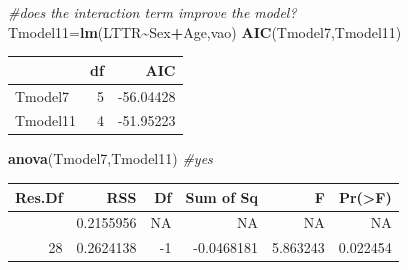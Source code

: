 \documentclass[
]{article}
\newenvironment{Shaded}{\begin{snugshade}}{\end{snugshade}}
\newcommand{\CommentTok}[1]{\textcolor[rgb]{0.56,0.35,0.01}{\textit{#1}}}
\newcommand{\FunctionTok}[1]{\textcolor[rgb]{0.13,0.29,0.53}{\textbf{#1}}}
\newcommand{\NormalTok}[1]{#1}
\newcommand{\OtherTok}[1]{\textcolor[rgb]{0.56,0.35,0.01}{#1}}
\newcommand{\SpecialCharTok}[1]{\textcolor[rgb]{0.81,0.36,0.00}{\textbf{#1}}}
\begin{document}
\begin{Shaded}
\begin{Highlighting}[]
\CommentTok{\#does the interaction term improve the model?}
\NormalTok{Tmodel11}\OtherTok{=}\FunctionTok{lm}\NormalTok{(LTTR}\SpecialCharTok{\textasciitilde{}}\NormalTok{Sex}\SpecialCharTok{+}\NormalTok{Age,vao)}
\FunctionTok{AIC}\NormalTok{(Tmodel7,Tmodel11)}
\end{Highlighting}
\end{Shaded}

\begin{longtable}[]{@{}lrr@{}}
\toprule\noalign{}
& df & AIC \\
\midrule\noalign{}
\endhead
\bottomrule\noalign{}
\endlastfoot
Tmodel7 & 5 & -56.04428 \\
Tmodel11 & 4 & -51.95223 \\
\end{longtable}

\begin{Shaded}
\begin{Highlighting}[]
\FunctionTok{anova}\NormalTok{(Tmodel7,Tmodel11) }\CommentTok{\#yes}
\end{Highlighting}
\end{Shaded}

\begin{longtable}[]{@{}rrrrrr@{}}
\toprule\noalign{}
Res.Df & RSS & Df & Sum of Sq & F & Pr(\textgreater F) \\
\midrule\noalign{}
\endhead
\bottomrule\noalign{}
\endlastfoot
27 & 0.2155956 & NA & NA & NA & NA \\
28 & 0.2624138 & -1 & -0.0468181 & 5.863243 & 0.022454 \\
\end{longtable}
\end{document}
